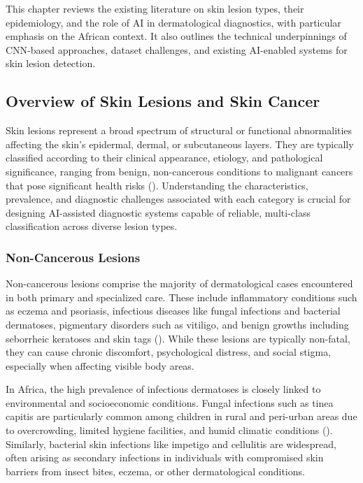 \documentclass[
  12pt,
  oneside]{article}
\begin{document}
This chapter reviews the existing literature on skin lesion types, their
epidemiology, and the role of AI in dermatological diagnostics, with
particular emphasis on the African context. It also outlines the
technical underpinnings of CNN-based approaches, dataset challenges, and
existing AI-enabled systems for skin lesion detection.

\subsection{Overview of Skin Lesions and Skin
Cancer}\label{overview-of-skin-lesions-and-skin-cancer}

Skin lesions represent a broad spectrum of structural or functional
abnormalities affecting the skin's epidermal, dermal, or subcutaneous
layers. They are typically classified according to their clinical
appearance, etiology, and pathological significance, ranging from
benign, non-cancerous conditions to malignant cancers that pose
significant health risks (). Understanding the characteristics, prevalence, and diagnostic
challenges associated with each category is crucial for designing
AI-assisted diagnostic systems capable of reliable, multi-class
classification across diverse lesion types.

\subsubsection{Non-Cancerous Lesions}\label{non-cancerous-lesions}

Non-cancerous lesions comprise the majority of dermatological cases
encountered in both primary and specialized care. These include
inflammatory conditions such as eczema and psoriasis, infectious
diseases like fungal infections and bacterial dermatoses, pigmentary
disorders such as vitiligo, and benign growths including seborrheic
keratoses and skin tags ().
While these lesions are typically non-fatal, they can cause chronic
discomfort, psychological distress, and social stigma, especially when
affecting visible body areas.

In Africa, the high prevalence of infectious dermatoses is closely
linked to environmental and socioeconomic conditions. Fungal infections
such as tinea capitis are particularly common among children in rural
and peri-urban areas due to overcrowding, limited hygiene facilities,
and humid climatic conditions (). Similarly, bacterial skin infections like impetigo and
cellulitis are widespread, often arising as secondary infections in
individuals with compromised skin barriers from insect bites, eczema, or
other dermatological conditions.
\end{document}
